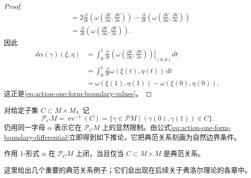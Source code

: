 \begin{proof}
\[\begin{aligned}
 &=2\frac\partial{\partial t}
   \left(\omega\left(\frac{\partial V}{\partial u},
                        \frac{\partial V}{\partial s}\right)\right)
 -\frac\partial{\partial t}
   \left(\omega\left(\frac{\partial V}{\partial u},
                        \frac{\partial V}{\partial s}\right)\right)\\
 &=\frac\partial{\partial t}
   \left(\omega\left(\frac{\partial V}{\partial u},
                        \frac{\partial V}{\partial s}\right)\right).
\end{aligned}
\]
因此
\[
\begin{aligned}
 d\alpha(\gamma)(\xi,\eta)
 &=\int_0^1\left.
   \frac\partial{\partial t}
   \left(\omega\left(\frac{\partial V}{\partial u},
                        \frac{\partial V}{\partial s}\right)\right)
   \right|_{(0,0)}dt\\
 &=\int_0^1\frac\partial{\partial t}\omega(\xi(t),\eta(t))\,dt\\
 &=\omega(\xi(1),\eta(1))-\omega(\xi(0),\eta(0)),
\end{aligned}
\]
这正是\eqref{eq:action-one-form-boundary-values}。
\end{proof}

对给定子集 $C\subset M\times M$，记
\[
 \mathcal P_CM=\operatorname{ev}^{-1}(C)
 =\{\gamma\in\mathcal PM\mid(\gamma(0),\gamma(1))\in C\}.
\]
仍用同一字母 $\alpha$ 表示它在 $\mathcal P_CM$ 上的显然限制。由公式\eqref{eq:action-one-form-boundary-differential}立即得到如下推论，它把典范关系刻画为自然边界条件。

\begin{corollary}\label{cor:canonical-relation-natural-boundary}
作用 $1$-形式 $\alpha$ 在 $\mathcal P_CM$ 上闭，当且仅当
$C\subset M\times M$ 是典范关系。
\end{corollary}

这里给出几个重要的典范关系例子；它们会出现在后续关于弗洛尔理论的各章中。

